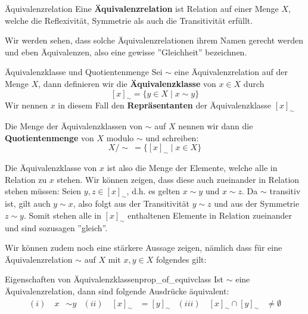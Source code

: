 \begin{definition}{Äquivalenzrelation}{}
Eine \textbf{Äquivalenzrelation} ist Relation auf einer Menge $X$, welche die Reflexivität, Symmetrie als auch die Transitivität erfüllt.
\end{definition}

Wir werden sehen, dass solche Äquivalenzrelationen ihrem Namen gerecht werden und eben Äquivalenzen, also eine gewisse ''Gleichheit'' bezeichnen. 

\begin{definition}{Äquivalenzklasse und Quotientenmenge}{}
Sei $\sim$ eine Äquivalenzrelation auf der Menge $X$, dann definieren wir die \textbf{Äquivalenzklasse} von $x \in X$ durch
$$[x]_\sim = \{y \in X \mid x \sim y\}$$
Wir nennen $x$ in diesem Fall den \textbf{Repräsentanten} der Äquivalenzklasse $[x]_\sim$

Die Menge der Äquivalenzklassen von $\sim$ auf $X$ nennen wir dann die \textbf{Quotientenmenge} von $X$ modulo $\sim$ und schreiben:
$$X\big/\!\sim \ = \{[x]_\sim \mid x \in X\}$$
\end{definition}
Die Äquivalenzklasse von $x$ ist also die Menge der Elemente, welche alle in Relation zu $x$ stehen. Wir können zeigen, dass diese auch zueinander in Relation stehen müssen: Seien $y, z \in [x]_\sim$, d.h. es gelten $x\sim y$ und $x \sim z$. Da $\sim$ transitiv ist, gilt auch $y \sim x$, also folgt aus der Transitivität $y \sim z$ und aus der Symmetrie $z \sim y$. Somit stehen alle in $[x]_\sim$ enthaltenen Elemente in Relation zueinander und sind sozusagen ''gleich''.

Wir können zudem noch eine stärkere Aussage zeigen, nämlich dass für eine Äquivalenzrelation $\sim$ auf $X$ mit $x,y \in X$ folgendes gilt:
\begin{lemma}{Eigenschaften von Äquivalenzklassen}{prop_of_equivclass}
Ist $\sim$ eine Äquivalenzrelation, dann sind folgende Ausdrücke äquivalent:
\begin{align*}
   (i)\quad x &\sim y & (ii)\quad [x]_\sim &= [y]_\sim & (iii)\quad [x]_\sim \cap [y]_\sim &\neq \emptyset
\end{align*}
\end{lemma}

